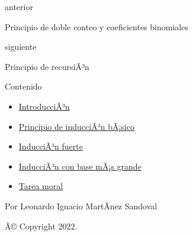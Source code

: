\href{DobleConteo.html}{\emph{}}

anterior

Principio de doble conteo y coeficientes binomiales

\href{Recursion.html}{}

siguiente

Principio de recursiÃ³n

\emph{}

\emph{} Contenido

\begin{itemize}
\tightlist
\item
  \hyperref[introduccion]{IntroducciÃ³n}
\item
  \hyperref[principio-de-induccion-basico]{Principio de inducciÃ³n
  bÃ¡sico}
\item
  \hyperref[induccion-fuerte]{InducciÃ³n fuerte}
\item
  \hyperref[induccion-con-base-mas-grande]{InducciÃ³n con base mÃ¡s
  grande}
\item
  \hyperref[tarea-moral]{Tarea moral}
\end{itemize}

Por Leonardo Ignacio MartÃ­nez Sandoval

Â© Copyright 2022.\\
